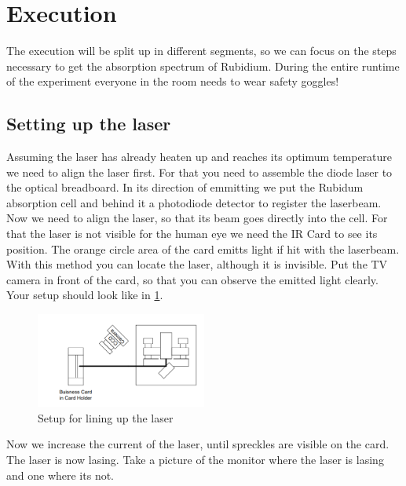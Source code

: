 \section{Execution}
\label{sec:Execution}

The execution will be split up in different segments, so we can focus on the steps necessary to get the absorption spectrum of Rubidium.
During the entire runtime of the experiment everyone in the room needs to wear safety goggles!

\subsection{Setting up the laser}
\label{ssec:exe1}

Assuming the laser has already heaten up and reaches its optimum temperature we need to align the laser first.
For that you need to assemble the diode laser to the optical breadboard.
In its direction of emmitting we put the Rubidum absorption cell and behind it a photodiode detector to register the laserbeam.
Now we need to align the laser, so that its beam goes directly into the cell.
For that the laser is not visible for the human eye we need the IR Card to see its position. 
The orange circle area of the card emitts light if hit with the laserbeam. 
With this method you can locate the laser, although it is invisible.
Put the TV camera in front of the card, so that you can observe the emitted light clearly.
Your setup should look like in \ref{fig:part1}.
\begin{figure}
    \centering
    \includegraphics[width=0.5\textwidth]{images/part1.png}
    \caption{Setup for lining up the laser \cite{V60}}
    \label{fig:part1}
\end{figure}
Now we increase the current of the laser, until spreckles are visible on the card. 
The laser is now lasing. 
Take a picture of the monitor where the laser is lasing and one where its not.

